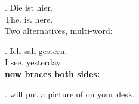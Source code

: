 \documentclass{article}
\begin{document}
\exg. Die  ist hier.\\
      The.  is. here.\\

\noindent Two alternatives, multi-word:

\exg. Ich sah  gestern.\\
      I see.  yesterday\\

\noindent\textbf{\texttt{\string\altn} now braces both sides:}

\ex.  will put a picture of  on your desk.
\end{document}

